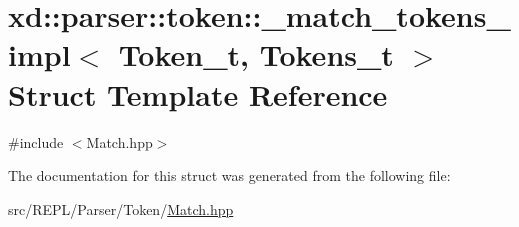 \hypertarget{structxd_1_1parser_1_1token_1_1__match__tokens__impl}{}\section{xd\+:\+:parser\+:\+:token\+:\+:\+\_\+match\+\_\+tokens\+\_\+impl$<$ Token\+\_\+t, Tokens\+\_\+t $>$ Struct Template Reference}
\label{structxd_1_1parser_1_1token_1_1__match__tokens__impl}


{\ttfamily \#include $<$Match.\+hpp$>$}



The documentation for this struct was generated from the following file\+:\begin{DoxyCompactItemize}
\item 
src/\+R\+E\+P\+L/\+Parser/\+Token/\mbox{\hyperlink{_parser_2_token_2_match_8hpp}{Match.\+hpp}}\end{DoxyCompactItemize}
